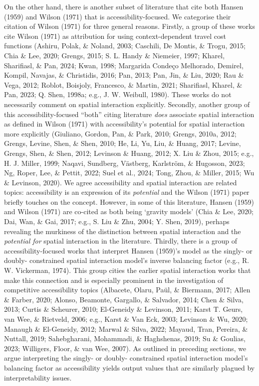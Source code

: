 \documentclass[
11pt, %
oneside, %
english, %
singlespacing, %
]{macthesis} %
\begin{document}
On the other hand, there is another subset of literature that cite both Hansen (1959) and Wilson (1971) that is accessibility-focused. We categorise their citation of Wilson (1971) for three general reasons. Firstly, a group of these works cite Wilson (1971) as attribution for using context-dependent travel cost functions (Ashiru, Polak, \& Noland, 2003; Caschili, De Montis, \& Trogu, 2015; Chia \& Lee, 2020; Grengs, 2015; S. L. Handy \& Niemeier, 1997; Kharel, Sharifiasl, \& Pan, 2024; Kwan, 1998; Margarida Condeço Melhorado, Demirel, Kompil, Navajas, \& Christidis, 2016; Pan, 2013; Pan, Jin, \& Liu, 2020; Rau \& Vega, 2012; Roblot, Boisjoly, Francesco, \& Martin, 2021; Sharifiasl, Kharel, \& Pan, 2023; Q. Shen, 1998a; e.g., J. W. Weibull, 1980). These works do not necessarily comment on spatial interaction explicitly. Secondly, another group of this accessibility-focused ``both'' citing literature \emph{does} associate spatial interaction as defined in Wilson (1971) with accessibility's potential for spatial interaction more explicitly (Giuliano, Gordon, Pan, \& Park, 2010; Grengs, 2010a, 2012; Grengs, Levine, Shen, \& Shen, 2010; He, Li, Yu, Liu, \& Huang, 2017; Levine, Grengs, Shen, \& Shen, 2012; Levinson \& Huang, 2012; X. Liu \& Zhou, 2015; e.g., H. J. Miller, 1999; Naqavi, Sundberg, Västberg, Karlström, \& Hugosson, 2023; Ng, Roper, Lee, \& Pettit, 2022; Suel et al., 2024; Tong, Zhou, \& Miller, 2015; Wu \& Levinson, 2020). We agree accessibility and spatial interaction are related topics: accessibility is an expression of its \emph{potential} and the Wilson (1971) paper briefly touches on the concept. However, in some of this literature, Hansen (1959) and Wilson (1971) are co-cited as both being `gravity models' (Chia \& Lee, 2020; Dai, Wan, \& Gai, 2017; e.g., S. Liu \& Zhu, 2004; Y. Shen, 2019), perhaps revealing the murkiness of the distinction between spatial interaction and the \emph{potential for} spatial interaction in the literature. Thirdly, there is a group of accessibility-focused works that interpret Hansen (1959)'s model as the singly- or doubly- constrained spatial interaction model's inverse balancing factor (e.g., R. W. Vickerman, 1974). This group cities the earlier spatial interaction works that make this connection and is especially prominent in the investigation of competitive accessibility topics (Albacete, Olaru, Paül, \& Biermann, 2017; Allen \& Farber, 2020; Alonso, Beamonte, Gargallo, \& Salvador, 2014; Chen \& Silva, 2013; Curtis \& Scheurer, 2010; El-Geneidy \& Levinson, 2011; Karst T. Geurs, van Wee, \& Rietveld, 2006; e.g., Karst \& Van Eck, 2003; Levinson \& Wu, 2020; Manaugh \& El-Geneidy, 2012; Marwal \& Silva, 2022; Mayaud, Tran, Pereira, \& Nuttall, 2019; Sahebgharani, Mohammadi, \& Haghshenas, 2019; Su \& Goulias, 2023; Willigers, Floor, \& van Wee, 2007). As outlined in preceding sections, we argue interpreting the singly- or doubly- constrained spatial interaction model's balancing factor as accessibility yields output values that are similarly plagued by interpretability issues.
\end{document}
